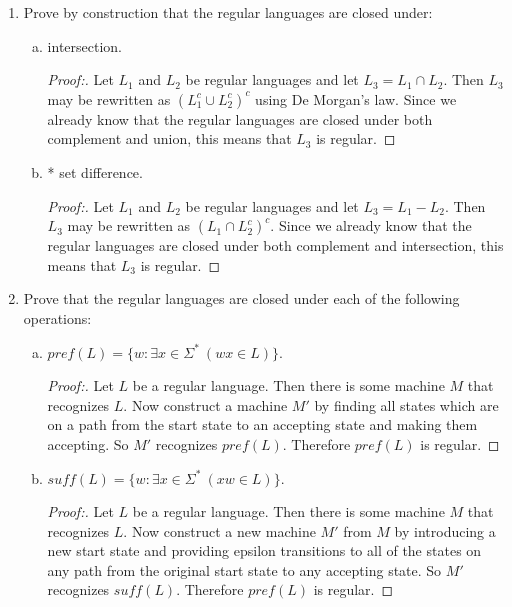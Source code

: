 \documentclass[10pt]{article}
\begin{document}
\begin{enumerate}[1)]

\item
Prove by construction that the regular languages are closed under:

\begin{enumerate}[a)]
\item
intersection.
\begin{proof}[Proof:]
Let $L_1$ and $L_2$ be regular languages and let $L_3 = L_1 \cap L_2$.  Then $L_3$ may be rewritten as $(L_1^c \cup L_2^c)^c$ using De Morgan's law.  Since we already know that the regular languages are closed under both complement and union, this means that $L_3$ is regular.
\end{proof}
 
\pagebreak
\item
* set difference.
\begin{proof}[Proof:]
Let $L_1$ and $L_2$ be regular languages and let $L_3 = L_1 - L_2$.  Then $L_3$ may be rewritten as $(L_1 \cap L_2^c)^c$.  Since we already know that the regular languages are closed under both complement and intersection, this means that $L_3$ is regular.
\end{proof}
\end{enumerate}

\item
Prove that the regular languages are closed under each of the following operations:
\begin{enumerate}[a)]
\item
$pref(L) = \{w: \exists x \in \Sigma ^*\ (wx \in L)\}$.
\begin{proof}[Proof:]
Let $L$ be a regular language.  Then there is some machine $M$ that recognizes $L$.  Now construct a machine $M'$ by finding all states which are on a path from the start state to an accepting state and making them accepting.  So $M'$ recognizes $pref(L)$.  Therefore $pref(L)$ is regular.
\end{proof}

\item
$suff(L) = \{w: \exists x \in \Sigma ^*\ (xw \in L)\}$.
\begin{proof}[Proof:]
Let $L$ be a regular language.  Then there is some machine $M$ that recognizes $L$.  Now construct a new machine $M'$ from $M$ by introducing a new start state and providing epsilon transitions to all of the states on any path from the original start state to any accepting state. So $M'$ recognizes $suff(L)$.  Therefore $pref(L)$ is regular.
\end{proof}
\end{enumerate}



\end{enumerate}
\end{document}
